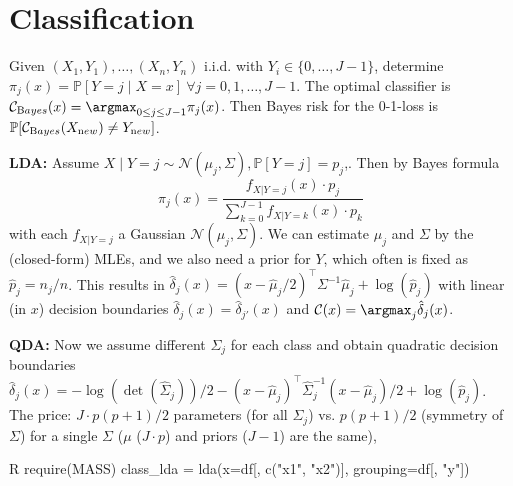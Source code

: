 \section{Classification}\label{sec:classification}
Given $(X_1, Y_1), \dots, (X_n,Y_n)$ i.i.d. with $Y_i \in \{0, \dots, J-1\}$, determine $\pi_j(x) = \mathbb{P}[Y=j\mid X=x]\ \forall j = 0,1,\dots,J-1$.
The optimal classifier is $\mathcal{C}_{\textrm Bayes}(x) = \argmax_{0\leq j\leq J-1}\pi_j(x)$.
Then Bayes risk for the 0-1-loss is $\mathbb{P}[\mathcal{C}_{\textrm Bayes}(X_{\textrm new}) \neq Y_{\textrm new}]$.

\begin{sectionbox}\nospacing{}
  \textbf{LDA: }Assume \mbox{$X \mid Y=j \sim \mathcal{N}(\mu_j, \Sigma), \mathbb{P}[Y=j] = p_j$,}.
  Then by Bayes formula $$\pi_j(x) = \frac{f_{X|Y=j}(x)\cdot p_j}{\sum_{k=0}^{J-1}f_{X|Y=k}(x)\cdot p_k}$$ with each $f_{X|Y=j}$ a Gaussian $\mathcal{N}(\mu_j, \Sigma)$.
  We can estimate $\mu_j$ and $\Sigma$ by the (closed-form) MLEs, and we also need a prior for $Y$, which often is fixed as $\hat p_j=n_j/n$.
  This results in $\hat \delta_j(x) = (x-\hat{\mu}_j/2)^{\top}\Sigma^{-1}\hat{\mu}_j+\log(\hat p_j)$ with linear (in $x$) decision boundaries $\hat{\delta}_j(x) = \hat \delta_{j'}(x)$ and $\mathcal{C}(x) = \argmax_j \hat \delta_j(x)$.

  \textbf{QDA: } Now we assume different $\Sigma_j$ for each class and obtain quadratic decision boundaries $\hat{\delta}_j(x) = -\log(\det(\hat\Sigma_j))/2 - (x-\hat{\mu}_j)^{\top}\hat{\Sigma}_j^{-1}(x-\hat{\mu}_j)/2 + \log(\hat p_j)$.
  The price: $J\cdot p(p+1)/2$ parameters (for all $\Sigma_j$) vs. $p(p+1)/2$ (symmetry of $\Sigma$) for a single $\Sigma$ ($\mu$ ($J\cdot p$) and priors ($J-1$) are the same),
    \begin{mintlinebox}{R}
    require(MASS)
    class_lda = lda(x=df[, c("x1", "x2")], grouping=df[, "y"])
  \end{mintlinebox}
\end{sectionbox}

